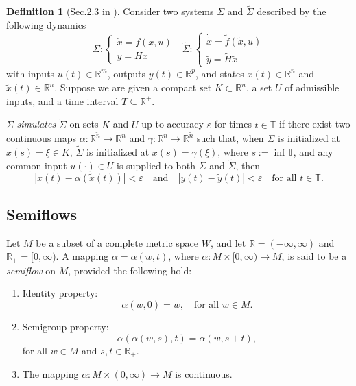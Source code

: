 \documentclass{article}
\theoremstyle{definition} \newtheorem{definition}{Definition}
\theoremstyle{remark} \newtheorem{remark}{Remark}
\newcounter{ct}
\begin{document}
\begin{definition}[Sec.2.3 in \citep{sontag1992neural}]\label{def:simulation}
Consider two systems $\Sigma$ and $\tilde\Sigma$ described by the following dynamics 
\begin{equation}
    \Sigma: \begin{cases}
        \dot x = f (x, u)\\ y = Hx
    \end{cases}
    \ \ \ 
    \tilde\Sigma: \begin{cases}
        \dot{\tilde x} = \tilde f (\tilde x, u)\\ \tilde y = \tilde H\tilde x
    \end{cases}
\end{equation} 
with inputs $u(t) \in \mathbb{R}^m$, outputs $y(t) \in \mathbb{R}^p$, and states $x(t) \in \mathbb{R}^n$ and $\tilde{x}(t) \in \mathbb{R}^{\tilde{n}}$. Suppose we are given a compact set $K \subset \mathbb{R}^n$, a set $U$ of admissible inputs, and a time interval $T \subseteq \mathbb{R}^+$.

$\Sigma$ \emph{simulates} $\tilde{\Sigma}$ on sets $K$ and $U$ up to accuracy $\varepsilon$ for times $t \in \mathbb{T}$ if there exist two continuous maps $\alpha : \mathbb{R}^{\tilde{n}} \to \mathbb{R}^n$ and $\gamma : \mathbb{R}^n \to \mathbb{R}^{\tilde{n}}$ such that, when $\Sigma$ is initialized at $x(s) = \xi \in K$, $\tilde{\Sigma}$ is initialized at $\tilde{x}(s) = \gamma(\xi)$, where $s := \inf \mathbb{T}$, and any common input $u(\cdot) \in U$ is supplied to both $\Sigma$ and $\tilde{\Sigma}$, then
\[
|x(t) - \alpha(\tilde{x}(t))| < \varepsilon \quad \text{and} \quad |y(t) - \tilde{y}(t)| < \varepsilon \quad \text{for all } t \in \mathbb{T}.
\]
\end{definition}


\subsection{Semiflows\citep{sell2013dynamics}}\label{sec:semiflow}
Let \( M \) be a subset of a complete metric space \( W \), and let \( \mathbb{R} = (-\infty, \infty) \) 
and \( \mathbb{R}_+ = [0, \infty) \). A mapping \( \alpha = \alpha(w,t) \), where 
\( \alpha: M \times [0,\infty) \to M \), is said to be a \textit{semiflow} on \( M \), provided the following hold:

\begin{enumerate}
    \item Identity property: 
    \[
    \alpha(w,0) = w, \quad \text{for all } w \in M.
    \]
    \item Semigroup property: 
    \[
    \alpha(\alpha(w,s),t) = \alpha(w,s+t),
    \]
    for all \( w \in M \) and \( s, t \in \mathbb{R}_+ \).
    \item The mapping \( \alpha: M \times (0,\infty) \to M \) is continuous.
\end{enumerate}
\end{document}
